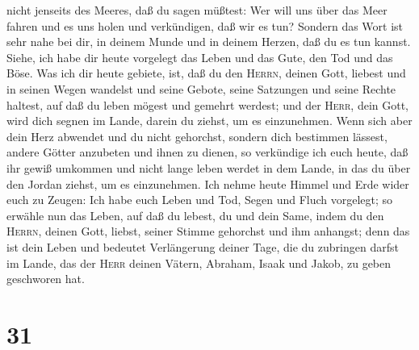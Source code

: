 nicht jenseits des Meeres, daß du sagen müßtest: Wer will uns über das
Meer fahren und es uns holen und verkündigen, daß wir es tun?
 Sondern das Wort ist sehr nahe bei dir, in deinem Munde
und in deinem Herzen, daß du es tun kannst.  Siehe, ich
habe dir heute vorgelegt das Leben und das Gute, den Tod und das Böse.
 Was ich dir heute gebiete, ist, daß du den
\textsc{Herrn}, deinen Gott, liebest und in seinen Wegen wandelst und
seine Gebote, seine Satzungen und seine Rechte haltest, auf daß du leben
mögest und gemehrt werdest; und der \textsc{Herr}, dein Gott, wird dich
segnen im Lande, darein du ziehst, um es einzunehmen. 
Wenn sich aber dein Herz abwendet und du nicht gehorchst, sondern dich
bestimmen lässest, andere Götter anzubeten und ihnen zu dienen,
 so verkündige ich euch heute, daß ihr gewiß umkommen und
nicht lange leben werdet in dem Lande, in das du über den Jordan ziehst,
um es einzunehmen.  Ich nehme heute Himmel und Erde wider
euch zu Zeugen: Ich habe euch Leben und Tod, Segen und Fluch vorgelegt;
so erwähle nun das Leben, auf daß du lebest, du und dein Same,
 indem du den \textsc{Herrn}, deinen Gott, liebst, seiner
Stimme gehorchst und ihm anhangst; denn das ist dein Leben und bedeutet
Verlängerung deiner Tage, die du zubringen darfst im Lande, das der
\textsc{Herr} deinen Vätern, Abraham, Isaak und Jakob, zu geben
geschworen hat.

\hypertarget{section-30}{%
\section{31}\label{section-30}}

